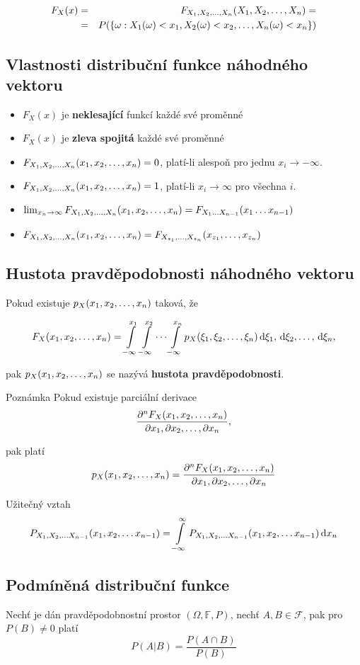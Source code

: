	\begin{eqnarray*}
	F_X(x)& = &F_{\vecrow[X]}(\vecrow[X])=\\
	&=&P(\brs{\omega: X_1(\omega)<x_1, X_2(\omega)<x_2,\ldots,X_n(\omega)<x_n})
	\end{eqnarray*}
	
	\subsection{Vlastnosti distribuční funkce náhodného vektoru}
	\begin{itemize}
	\item $F_X(x)$ je \textbf{neklesající} funkcí každé své proměnné
	\item $F_X(x)$ je \textbf{zleva spojitá} každé své proměnné
	\item $F_{\vecrow[X]}(\vecrow[x])=0$, platí-li alespoň pro jednu $x_i\to-\infty$.
	\item $F_{\vecrow[X]}(\vecrow[x])=1$, platí-li $x_i\to\infty$ pro všechna $i$.
	\item $\lim_{x_n\to\infty}F_{\vecrow[X]}(\vecrow[x])=F_{X_1\ldots X_{n-1}}(x_1\ldots x_{n-1})$
	\item $F_{\vecrow[X]}(\vecrow[x])=F_{X_{z_1},\ldots,X_{z_n}}(x_{z_1},\ldots,x_{z_n})$
	\end{itemize}
	
	\subsection{Hustota pravděpodobnosti náhodného vektoru}
	Pokud existuje $p_X(\vecrow[x])$ taková, že 
	
	\[ F_X(\vecrow[x])=\int\limits_{-\infty}^{x_1}\int\limits_{-\infty}^{x_2}\cdots\int\limits_{-\infty}^{x_n} p_X(\vecrow[\xi])\vecrow[\d\xi], \]
	
	pak $p_X(\vecrow[x])$ se nazývá \textbf{hustota pravděpodobnosti}.
	
	\begin{note}{Poznámka}
	Pokud existuje parciální derivace
	\[ \frac{\partial^n F_X(\vecrow[x])}{\vecrow[\partial x]}, \]
	
	pak platí
	\[ p_X(\vecrow[x])=\frac{\partial^n F_X(\vecrow[x])}{\vecrow[\partial x]} \]
	
	Užitečný vztah
	\[ P_{X_1,X_2,\ldots X_{n-1}}(x_1,x_2,\ldots x_{n-1}) = \int\limits_{-\infty}^\infty P_{X_1,X_2,\ldots X_{n-1}}(x_1,x_2,\ldots x_{n-1})\d x_n \]
	\end{note}
	
	\subsection{Podmíněná distribuční funkce}
	Nechť je dán pravděpodobnostní prostor $(\Omega,\mathbb{F},P)$, nechť $A,B\in\mathscr{F}$, pak pro $P(B)\neq 0$ platí 
	\[ P(A|B)=\frac{P(A\cap B)}{P(B)} \]
	
